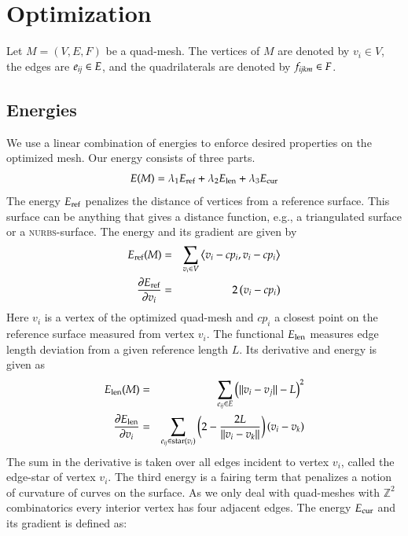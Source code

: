 \documentclass[Thesis.tex]{subfiles}
\begin{document}
\section{Optimization}

Let $M=(V,E,F)$ be a quad-mesh. The vertices of $M$ are denoted by $v_i \in V$, the edges
are $e_{\mathrm{\it{ij}}} \in E$, and the quadrilaterals are denoted by $f_{\mathrm{\it{ijkm}}} \in F$.
\subsection{Energies}
We use a linear combination of energies to enforce desired properties on the optimized mesh.
Our energy consists of three parts.
\begin{equation}
	E(M) =	\lambda_1 E_{\textrm{\scriptsize{ref}}} + 
		\lambda_2 E_{\textrm{\scriptsize{len}}} +
		\lambda_3 E_{\textrm{\scriptsize{cur}}}
	\label{eq:energy_combination}
\end{equation}
The energy $E_{\textrm{\scriptsize{ref}}}$ penalizes the distance of vertices from a
reference surface. This surface can be anything that gives a distance function, e.g., a
triangulated surface or a \textsc{nurbs}-surface. The energy and its gradient are given 
by
\begin{eqnarray*}
	E_{\textrm{\scriptsize{ref}}}(M) &=& 
	\sum_{v_i \in V}\left<v_i - cp_i, v_i - cp_i\right> \\
	\frac{\partial E_\textrm{\scriptsize{ref}}}{\partial v_i} &=&
	2\left(v_i - cp_i\right)
	\label{eq:energy_reference}
\end{eqnarray*}
Here $v_i$ is a vertex of the optimized quad-mesh and $cp_i$ a closest point on the reference
surface measured from vertex $v_i$. The functional $E_{\textrm{\scriptsize{len}}}$ measures
edge length deviation from a given reference length $L$. Its derivative and energy is given as
\begin{eqnarray*}
	E_{\textrm{\scriptsize{len}}}(M) &=& 
	\sum_{e_{\mathrm{\it{ij}}} \in E} \left(\Vert v_i - v_j \Vert - L\right)^2\\
	\frac{\partial E_\textrm{\scriptsize{len}}}{\partial v_i} &=& 
	\sum_{e_{\mathrm{\it{ij}}} \in \textrm{\scriptsize{star}}(v_i)}
	\left(2 - \frac{2L}{\Vert v_i - v_k \Vert}\right)\left(v_i - v_k \right)
\end{eqnarray*}
The sum in the derivative is taken over all edges incident to vertex $v_i$, called the 
edge-star of vertex $v_i$. The third energy is a fairing term that penalizes a notion of
curvature of curves on the surface. As we only deal with quad-meshes with $\mathbb Z^2$ combinatorics every interior vertex has four adjacent edges. The energy $E_{\textrm{\scriptsize{cur}}}$ and its gradient is defined as:
\end{document}
